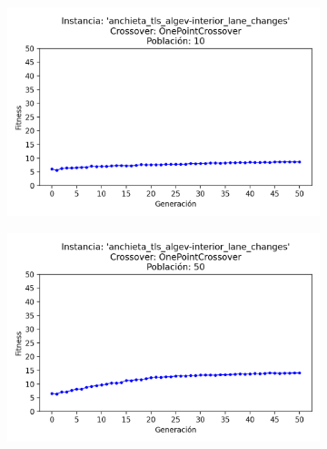 \begin{figure}[h]
    \centering
    \begin{subfigure}[t]{.49\textwidth}
      \centering
      \includegraphics[width=\textwidth]{report/images/estudio/anchieta_tls_algev-interior_lane_changes-OnePointCrossover-10.png}
    \end{subfigure}
    \hfill
    \begin{subfigure}[t]{.49\textwidth}
      \centering
      \includegraphics[width=\textwidth]{report/images/estudio/anchieta_tls_algev-interior_lane_changes-OnePointCrossover-50.png}
    \end{subfigure}
    \vspace{0.7cm}
    \begin{subfigure}[t]{.49\textwidth}
      \centering

\end{subfigure}
\end{figure}
